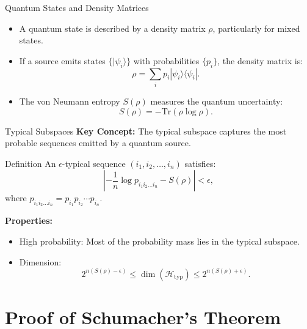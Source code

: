 \begin{frame}{Quantum States and Density Matrices}
    \begin{itemize}
        \item A quantum state is described by a density matrix \( \rho \), particularly for mixed states.
        \item If a source emits states \( \{ |\psi_i\rangle \} \) with probabilities \( \{ p_i \} \), the density matrix is:
        \[
        \rho = \sum_i p_i |\psi_i\rangle \langle \psi_i|.
        \]
        \item The von Neumann entropy \( S(\rho) \) measures the quantum uncertainty:
        \[
        S(\rho) = -\text{Tr}(\rho \log \rho).
        \]
    \end{itemize}
\end{frame}

\begin{frame}{Typical Subspaces}
    \textbf{Key Concept:} The typical subspace captures the most probable sequences emitted by a quantum source.
    \begin{block}{Definition}
        An \(\epsilon\)-typical sequence \((i_1, i_2, \dots, i_n)\) satisfies:
        \[
        \left| -\frac{1}{n} \log p_{i_1 i_2 \dots i_n} - S(\rho) \right| < \epsilon,
        \]
        where \( p_{i_1 i_2 \dots i_n} = p_{i_1} p_{i_2} \cdots p_{i_n} \).
    \end{block}
    \textbf{Properties:}
    \begin{itemize}
        \item High probability: Most of the probability mass lies in the typical subspace.
        \item Dimension: 
        \[
        2^{n(S(\rho) - \epsilon)} \leq \dim(\mathcal{H}_{\text{typ}}) \leq 2^{n(S(\rho) + \epsilon)}.
        \]
    \end{itemize}
\end{frame}

\section{Proof of Schumacher's Theorem}

